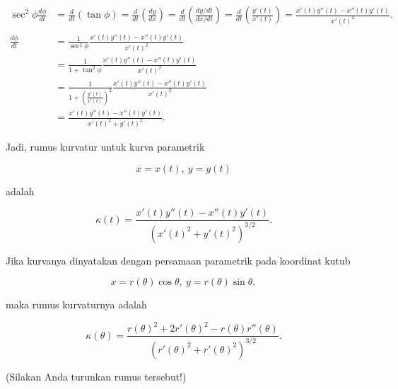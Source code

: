\documentclass[a4paper,10pt]{article}
\begin{document}
\begin{eulernotebook}
\begin{eulercomment}
\begin{eulercomment}
\begin{eulercomment}
\begin{eulercomment}
\begin{eulercomment}
\end{eulercomment}
\begin{eulerformula}
\[
\begin{aligned}\sec^2\phi\frac{d\phi}{dt} &= \frac{d}{dt}\left(\tan\phi\right)= \frac{d}{dt}\left(\frac{dy}{dx}\right)= \frac{d}{dt}\left(\frac{dy/dt}{dx/dt}\right)= \frac{d}{dt}\left(\frac{y'(t)}{x'(t)}\right)=\frac{x'(t)y''(t)-x''(t)y'(t)}{x'(t)^2}.\\ & \\ \frac{d\phi}{dt} &= \frac{1}{\sec^2\phi}\frac{x'(t)y''(t)-x''(t)y'(t)}{x'(t)^2}\\ &= \frac{1}{1+\tan^2\phi}\frac{x'(t)y''(t)-x''(t)y'(t)}{x'(t)^2}\\ &= \frac{1}{1+\left(\frac{y'(t)}{x'(t)}\right)^2}\frac{x'(t)y''(t)-x''(t)y'(t)}{x'(t)^2}\\ &= \frac{x'(t)y''(t)-x''(t)y'(t)}{x'(t)^2+y'(t)^2}.\end{aligned}
\]
\end{eulerformula}
\begin{eulercomment}
Jadi, rumus kurvatur untuk kurva parametrik

\end{eulercomment}
\begin{eulerformula}
\[
x=x(t),\ y=y(t)
\]
\end{eulerformula}
\begin{eulercomment}
adalah

\end{eulercomment}
\begin{eulerformula}
\[
\kappa(t) = \frac{x'(t)y''(t)-x''(t)y'(t)}{\left(x'(t)^2+y'(t)^2\right)^{3/2}}.
\]
\end{eulerformula}
\begin{eulercomment}
Jika kurvanya dinyatakan dengan persamaan parametrik pada koordinat
kutub

\end{eulercomment}
\begin{eulerformula}
\[
x=r(\theta)\cos\theta,\ y=r(\theta)\sin\theta,
\]
\end{eulerformula}
\begin{eulercomment}
maka rumus kurvaturnya adalah

\end{eulercomment}
\begin{eulerformula}
\[
\kappa(\theta) = \frac{r(\theta)^2+2r'(\theta)^2-r(\theta)r''(\theta)}{\left(r'(\theta)^2+r'(\theta)^2\right)^{3/2}}.
\]
\end{eulerformula}
\begin{eulercomment}
(Silakan Anda turunkan rumus tersebut!)


\end{eulercomment}
\end{eulercomment}
\end{eulercomment}
\end{eulercomment}
\end{eulercomment}
\end{eulernotebook}
\end{document}
